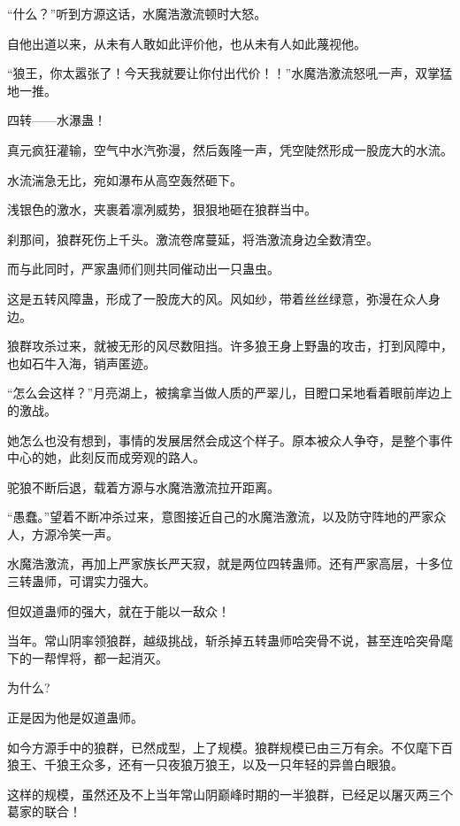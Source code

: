 
\begin{this_body}



“什么？”听到方源这话，水魔浩激流顿时大怒。

自他出道以来，从未有人敢如此评价他，也从未有人如此蔑视他。

“狼王，你太嚣张了！今天我就要让你付出代价！！”水魔浩激流怒吼一声，双掌猛地一推。

四转——水瀑蛊！

真元疯狂灌输，空气中水汽弥漫，然后轰隆一声，凭空陡然形成一股庞大的水流。

水流湍急无比，宛如瀑布从高空轰然砸下。

浅银色的激水，夹裹着凛冽威势，狠狠地砸在狼群当中。

刹那间，狼群死伤上千头。激流卷席蔓延，将浩激流身边全数清空。

而与此同时，严家蛊师们则共同催动出一只蛊虫。

这是五转风障蛊，形成了一股庞大的风。风如纱，带着丝丝绿意，弥漫在众人身边。

狼群攻杀过来，就被无形的风尽数阻挡。许多狼王身上野蛊的攻击，打到风障中，也如石牛入海，销声匿迹。

“怎么会这样？”月亮湖上，被擒拿当做人质的严翠儿，目瞪口呆地看着眼前岸边上的激战。

她怎么也没有想到，事情的发展居然会成这个样子。原本被众人争夺，是整个事件中心的她，此刻反而成旁观的路人。

驼狼不断后退，载着方源与水魔浩激流拉开距离。

“愚蠢。”望着不断冲杀过来，意图接近自己的水魔浩激流，以及防守阵地的严家众人，方源冷笑一声。

水魔浩激流，再加上严家族长严天寂，就是两位四转蛊师。还有严家高层，十多位三转蛊师，可谓实力强大。

但奴道蛊师的强大，就在于能以一敌众！

当年。常山阴率领狼群，越级挑战，斩杀掉五转蛊师哈突骨不说，甚至连哈突骨麾下的一帮悍将，都一起消灭。

为什么?

正是因为他是奴道蛊师。

如今方源手中的狼群，已然成型，上了规模。狼群规模已由三万有余。不仅麾下百狼王、千狼王众多，还有一只夜狼万狼王，以及一只年轻的异兽白眼狼。

这样的规模，虽然还及不上当年常山阴巅峰时期的一半狼群，已经足以屠灭两三个葛家的联合！


\end{this_body}
